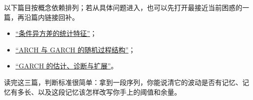 以下篇目按概念依赖排列；若从具体问题进入，也可以先打开最接近当前困惑的一篇，再沿篇内链接回补。

\begin{itemize}
\tightlist
\item \hyperref[sec:11-Mathematical-Statistics/10-GARCH-and-Volatility/01]{``条件异方差的统计特征''}；
\item \hyperref[sec:11-Mathematical-Statistics/10-GARCH-and-Volatility/02]{``ARCH 与 GARCH 的随机过程结构''}；
\item \hyperref[sec:11-Mathematical-Statistics/10-GARCH-and-Volatility/03]{``GARCH 的估计、诊断与扩展''}。
\end{itemize}

读完这三篇，判断标准很简单：拿到一段序列，你能说清它的波动是否有记忆、记忆有多长、以及这段记忆该怎样改写你手上的阈值和余量。

